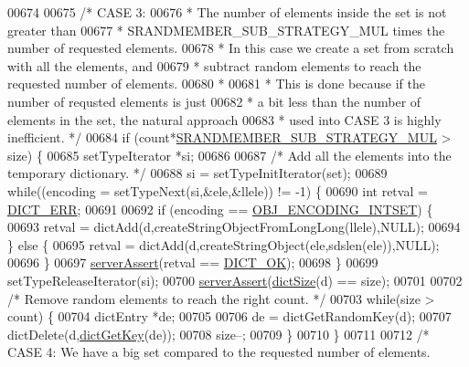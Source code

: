 \begin{DoxyCode}
00674 
00675     \textcolor{comment}{/* CASE 3:}
00676 \textcolor{comment}{     * The number of elements inside the set is not greater than}
00677 \textcolor{comment}{     * SRANDMEMBER\_SUB\_STRATEGY\_MUL times the number of requested elements.}
00678 \textcolor{comment}{     * In this case we create a set from scratch with all the elements, and}
00679 \textcolor{comment}{     * subtract random elements to reach the requested number of elements.}
00680 \textcolor{comment}{     *}
00681 \textcolor{comment}{     * This is done because if the number of requsted elements is just}
00682 \textcolor{comment}{     * a bit less than the number of elements in the set, the natural approach}
00683 \textcolor{comment}{     * used into CASE 3 is highly inefficient. */}
00684     \textcolor{keywordflow}{if} (count*\hyperlink{t__set_8c_a9edf8cf2fd1e44f7347fd8a19ba92257}{SRANDMEMBER\_SUB\_STRATEGY\_MUL} > size) \{
00685         setTypeIterator *si;
00686 
00687         \textcolor{comment}{/* Add all the elements into the temporary dictionary. */}
00688         si = setTypeInitIterator(set);
00689         \textcolor{keywordflow}{while}((encoding = setTypeNext(si,&ele,&llele)) != -1) \{
00690             \textcolor{keywordtype}{int} retval = \hyperlink{dict_8h_a6ce31f31f044b1570d335e8fa0c388c6}{DICT\_ERR};
00691 
00692             \textcolor{keywordflow}{if} (encoding == \hyperlink{server_8h_a214173987de21c3b7661fddd42b05873}{OBJ\_ENCODING\_INTSET}) \{
00693                 retval = dictAdd(d,createStringObjectFromLongLong(llele),NULL);
00694             \} \textcolor{keywordflow}{else} \{
00695                 retval = dictAdd(d,createStringObject(ele,sdslen(ele)),NULL);
00696             \}
00697             \hyperlink{server_8h_a88114b5169b4c382df6b56506285e56a}{serverAssert}(retval == \hyperlink{dict_8h_a2afecbeab8f7efbc183048f52f6d17e5}{DICT\_OK});
00698         \}
00699         setTypeReleaseIterator(si);
00700         \hyperlink{server_8h_a88114b5169b4c382df6b56506285e56a}{serverAssert}(\hyperlink{dict_8h_af193430dd3d5579a52b194512f72c1f0}{dictSize}(d) == size);
00701 
00702         \textcolor{comment}{/* Remove random elements to reach the right count. */}
00703         \textcolor{keywordflow}{while}(size > count) \{
00704             dictEntry *de;
00705 
00706             de = dictGetRandomKey(d);
00707             dictDelete(d,\hyperlink{dict_8h_a3271c334309904a3086deca94f96e46e}{dictGetKey}(de));
00708             size--;
00709         \}
00710     \}
00711 
00712     \textcolor{comment}{/* CASE 4: We have a big set compared to the requested number of elements.}

\end{DoxyCode}
